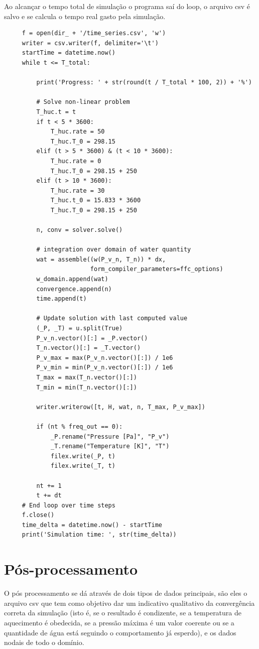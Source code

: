     Ao alcançar o tempo total de simulação o programa saí do loop, o arquivo csv
    é salvo e se calcula o tempo real gasto pela simulação.
    
     \begin{verbatim}
     f = open(dir_ + '/time_series.csv', 'w')
     writer = csv.writer(f, delimiter='\t')
     startTime = datetime.now()
     while t <= T_total:

         print('Progress: ' + str(round(t / T_total * 100, 2)) + '%')
     
         # Solve non-linear problem
         T_huc.t = t
         if t < 5 * 3600:
             T_huc.rate = 50
             T_huc.T_0 = 298.15
         elif (t > 5 * 3600) & (t < 10 * 3600):
             T_huc.rate = 0
             T_huc.T_0 = 298.15 + 250
         elif (t > 10 * 3600):
             T_huc.rate = 30
             T_huc.t_0 = 15.833 * 3600
             T_huc.T_0 = 298.15 + 250

         n, conv = solver.solve()

         # integration over domain of water quantity
         wat = assemble((w(P_v_n, T_n)) * dx,
                        form_compiler_parameters=ffc_options)
         w_domain.append(wat)
         convergence.append(n)
         time.append(t)

         # Update solution with last computed value
         (_P, _T) = u.split(True)
         P_v_n.vector()[:] = _P.vector()
         T_n.vector()[:] = _T.vector()
         P_v_max = max(P_v_n.vector()[:]) / 1e6
         P_v_min = min(P_v_n.vector()[:]) / 1e6
         T_max = max(T_n.vector()[:])
         T_min = min(T_n.vector()[:])

         writer.writerow([t, H, wat, n, T_max, P_v_max])

         if (nt % freq_out == 0):
             _P.rename("Pressure [Pa]", "P_v")
             _T.rename("Temperature [K]", "T")
             filex.write(_P, t)
             filex.write(_T, t)

         nt += 1
         t += dt
     # End loop over time steps
     f.close()
     time_delta = datetime.now() - startTime
     print('Simulation time: ', str(time_delta))
    \end{verbatim} 
   
    \section{Pós-processamento}
    O pós processamento se dá através de dois tipos de dados principais, são
    eles o arquivo csv que tem como objetivo dar um indicativo qualitativo da
    convergência correta da simulação (isto é, se o resultado é condizente, se a
    temperatura de aquecimento é obedecida, se a pressão máxima é um valor
    coerente ou se a quantidade de água está seguindo o comportamento já
    esperdo), e os dados nodais de todo o domínio.

